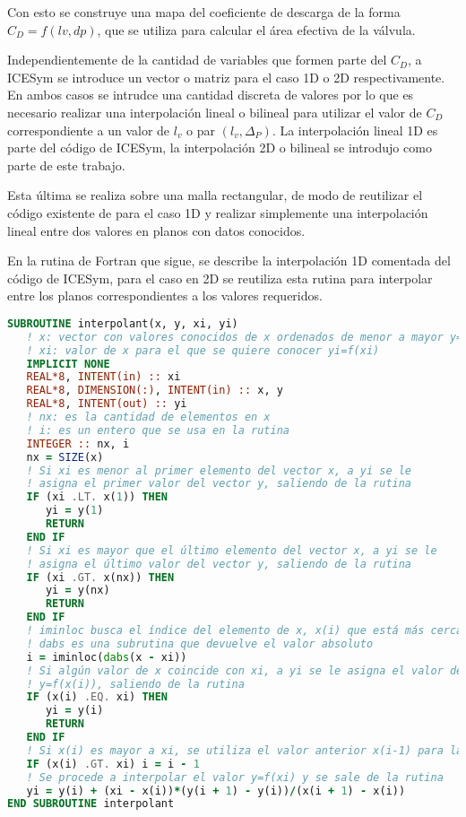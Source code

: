 Con esto se construye una mapa del coeficiente de descarga de la forma $C_D =
f(lv, dp)$, que se utiliza para calcular el área efectiva de la válvula.

Independientemente de la cantidad de variables que formen parte del $C_{D}$, a
ICESym se introduce un vector o matriz para el caso 1D o 2D respectivamente.
%
En ambos casos se intrudce una cantidad discreta de valores por lo que es
necesario realizar una interpolación lineal o bilineal para utilizar el valor de
$C_{D}$ correspondiente a un valor de $l_{v}$ o par $(l_{v}, \Delta_{P})$.
%
La interpolación lineal 1D es parte del código de ICESym, la interpolación 2D o
bilineal se introdujo como parte de este trabajo.

Esta última se realiza sobre una malla rectangular, de modo de reutilizar el
código existente de para el caso 1D y realizar  simplemente una interpolación
lineal entre dos valores en planos con datos conocidos.

En la rutina de Fortran que sigue, se describe la interpolación 1D comentada del
código de ICESym, para el caso en 2D se reutiliza esta rutina para interpolar
entre los planos correspondientes a los valores requeridos.

{\small
\begin{lstlisting}[basicstyle=\scriptsize, language=fortran, caption=Interpolación 1D]
SUBROUTINE interpolant(x, y, xi, yi)
   ! x: vector con valores conocidos de x ordenados de menor a mayor y=f(x)
   ! xi: valor de x para el que se quiere conocer yi=f(xi)
   IMPLICIT NONE
   REAL*8, INTENT(in) :: xi
   REAL*8, DIMENSION(:), INTENT(in) :: x, y
   REAL*8, INTENT(out) :: yi
   ! nx: es la cantidad de elementos en x
   ! i: es un entero que se usa en la rutina
   INTEGER :: nx, i
   nx = SIZE(x)
   ! Si xi es menor al primer elemento del vector x, a yi se le
   ! asigna el primer valor del vector y, saliendo de la rutina
   IF (xi .LT. x(1)) THEN
      yi = y(1)
      RETURN
   END IF
   ! Si xi es mayor que el último elemento del vector x, a yi se le
   ! asigna el último valor del vector y, saliendo de la rutina
   IF (xi .GT. x(nx)) THEN
      yi = y(nx)
      RETURN
   END IF
   ! iminloc busca el índice del elemento de x, x(i) que está más cercano a xi.
   ! dabs es una subrutina que devuelve el valor absoluto
   i = iminloc(dabs(x - xi))
   ! Si algún valor de x coincide con xi, a yi se le asigna el valor de
   ! y=f(x(i)), saliendo de la rutina
   IF (x(i) .EQ. xi) THEN
      yi = y(i)
      RETURN
   END IF
   ! Si x(i) es mayor a xi, se utiliza el valor anterior x(i-1) para la interpoación
   IF (x(i) .GT. xi) i = i - 1
   ! Se procede a interpolar el valor y=f(xi) y se sale de la rutina
   yi = y(i) + (xi - x(i))*(y(i + 1) - y(i))/(x(i + 1) - x(i))
END SUBROUTINE interpolant
\end{lstlisting}
}


